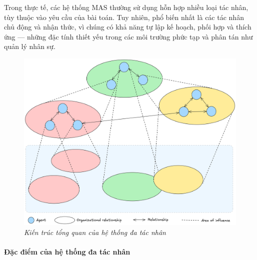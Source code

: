 \documentclass{article}
\begin{document}
Trong thực tế, các hệ thống MAS thường sử dụng hỗn hợp nhiều loại tác nhân, tùy thuộc vào yêu cầu của bài toán. Tuy nhiên, phổ biến nhất là các tác nhân chủ động và nhận thức, vì chúng có khả năng tự lập kế hoạch, phối hợp và thích ứng — những đặc tính thiết yếu trong các môi trường phức tạp và phân tán như quản lý nhân sự.

\begin{figure}[H]
    \centering
    \includegraphics[width=1\linewidth]{img/mas.png}
    \caption{\centering \textit{Kiến trúc tổng quan của hệ thống đa tác nhân}}
    \label{fig:mas}
\end{figure}

\paragraph{Đặc điểm của hệ thống đa tác nhân}
\end{document}
